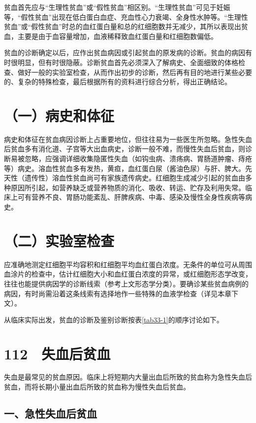 贫血首先应与“生理性贫血”或“假性贫血”相区别。“生理性贫血”可见于妊娠等，“假性贫血”出现在低白蛋白血症、充血性心力衰竭、全身性水肿等。“生理性贫血”或“假性贫血”时总的血红蛋白量和总的红细胞数并无减少，其所以表现出贫血，主要是由于血容量增加，血液稀释致血红蛋白量和红细胞数偏低。

贫血的诊断确定以后，应作出贫血病因或引起贫血的原发病的诊断。贫血的病因有时很明显，但有时很隐蔽。诊断贫血首先必须深入了解病史、全面细致的体格检查、做好一般的实验室检查，从而作出初步的诊断，然后再有目的地进行某些必要的、复杂的特殊检查，最后根据所有的资料进行综合分析，得出正确结论。

\section{（一）病史和体征}

病史和体征在贫血病因诊断上占重要地位，但往往易为一些医生所忽略。急性失血后贫血多有消化道、子宫等大出血病史，诊断一般不难，而慢性失血后贫血，则诊断易被忽略，应强调详细收集隐匿性失血（如钩虫病、溃疡病、胃肠道肿瘤、痔疮等）病史。溶血性贫血多有发热，黄疸，血红蛋白尿（酱油色尿）与肝、脾大。先天性（遗传性）溶血性贫血尚可有家族遗传病史。红细胞生成减少引起的贫血由多种原因所引起，如营养缺乏或营养物质的消化、吸收、转运、贮存及利用失常。临床上可有营养不良、胃肠功能紊乱、肝脾疾病、中毒、感染及慢性全身性疾病等病史。

\section{（二）实验室检查}

应准确地测定红细胞平均容积和红细胞平均血红蛋白浓度。无条件的单位可从周围血涂片的检查中，估计红细胞大小和血红蛋白浓度的异常，或红细胞形态学改变，往往也能提供病因学的诊断线索（参考上文形态学分类）。要确诊某些贫血病例的病因，有时尚需沿着这条线索有选择地作一些特殊的血液学检查（详见本章下文）。

从临床实际出发，贫血的诊断及鉴别诊断按表\ref{tab33-1}的顺序讨论如下。

\protect\hypertarget{text00257.html}{}{}

\section{112　失血后贫血}

失血是最常见的贫血原因。临床上将短期内大量出血后所致的贫血称为急性失血后贫血，而将长期小量出血后所致的贫血称为慢性失血后贫血。

\subsection{一、急性失血后贫血}

